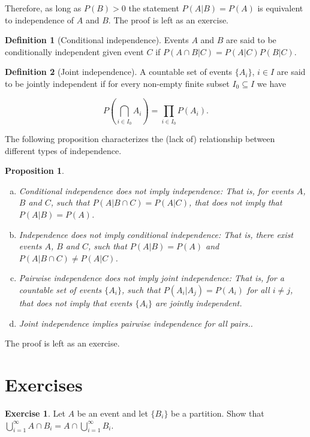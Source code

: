 \documentclass{book}
\theoremstyle{plain}%
\newtheorem{proposition}{Proposition}[section]
\theoremstyle{definition}
\newtheorem{definition}{Definition}[section]
\newtheorem{exercise}{Exercise}[chapter]
\begin{document}
Therefore, as long as $P(B) > 0$ the statement $P(A|B) = P(A)$ is equivalent to independence of $A$ and $B$. The proof is left as an exercise.

\begin{definition}[Conditional independence]
Events $A$ and $B$ are said to be conditionally independent given event $C$ if $P(A \cap B|C) = P(A|C)P(B|C)$.
\end{definition}

\begin{definition}[Joint independence]
A countable set of events $\{A_i\}$, $i \in I$ are said to be jointly independent if for every non-empty finite subset $I_0 \subseteq I$ we have 

$$\displaystyle P(\bigcap_{i \in I_0} A_i) = \prod_{i \in I_0} P(A_i).$$
\end{definition}

The following proposition characterizes the (lack of) relationship between different types of independence.

\begin{proposition}
\text{ }
\vspace{0.0cm}
\begin{enumerate}[(a)]
\item \emph{Conditional independence does not imply independence}: That is, for events $A$, $B$ and $C$, such that $P(A|B \cap C) = P(A|C)$, that does not imply that $P(A|B) = P(A)$.
\item \emph{Independence does not imply conditional independence}: That is, there exist events $A$, $B$ and $C$, such that $P(A|B) = P(A)$ and $P(A|B \cap C) \neq P(A|C)$.
\item \emph{Pairwise independence does not imply joint independence}: That is, for a countable set of events $\{A_i\}$, such that $P(A_i|A_j) = P(A_i)$ for all $i \neq j$, that does not imply that events $\{A_i\}$ are jointly independent.
\item \emph{Joint independence implies pairwise independence for all pairs.}.
\end{enumerate}\label{prop:independence}
\end{proposition}

The proof is left as an exercise.

\section*{Exercises}

\begin{exercise}
Let $A$ be an event and let $\{B_i\}$ be a partition. Show that
$\bigcup_{i=1}^\infty A \cap B_i = A \cap \bigcup_{i=1}^\infty B_i$.
\end{exercise}
\end{document}
